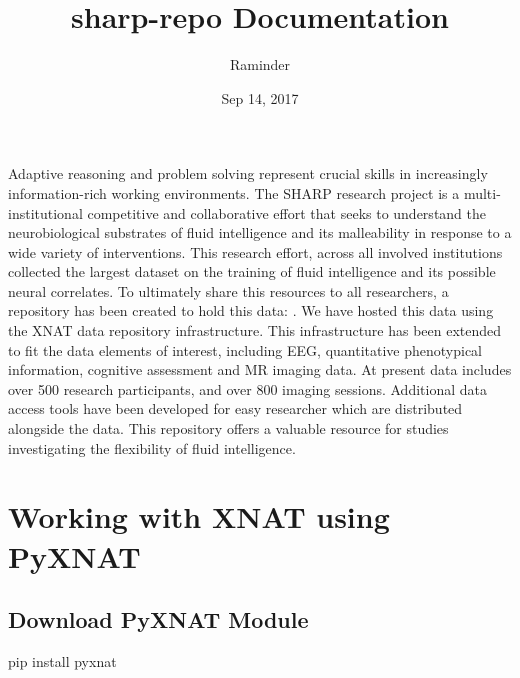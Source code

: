 \documentclass[letterpaper,10pt,english]{sphinxmanual}
\title{sharp-repo Documentation}
\date{Sep 14, 2017}
\author{Raminder}
\begin{document}
\maketitle
\sphinxtableofcontents
{}\label{\detokenize{index::doc}}


Adaptive reasoning and problem solving represent crucial skills in increasingly information-rich working environments. The SHARP research project is a multi-institutional competitive and collaborative effort that seeks to understand the neurobiological substrates of fluid intelligence and its malleability in response to a wide variety of interventions.  This research effort, across all involved institutions collected the largest dataset on the training of fluid intelligence and its possible neural correlates.  To ultimately share this resources to all researchers, a repository has been created to hold this data: .  We have hosted this data using the XNAT data repository infrastructure.  This infrastructure has been extended to fit the data elements of interest, including EEG, quantitative phenotypical information, cognitive assessment and MR imaging data.  At present data includes over 500 research participants, and over 800 imaging sessions. Additional data access tools have been developed for easy researcher which are distributed alongside the data. This repository offers a valuable resource for studies investigating the flexibility of fluid intelligence.

\noindent{}


\chapter{Working with XNAT using PyXNAT}
\label{\detokenize{Sharp_Working_Guide:working-with-xnat-using-pyxnat}}\label{\detokenize{Sharp_Working_Guide:welcome-to-strengthening-human-adaptive-reasoning-and-problem-solving-sharp-repository-documentation}}\label{\detokenize{Sharp_Working_Guide::doc}}

\section{Download PyXNAT Module}
\label{\detokenize{Sharp_Working_Guide:download-pyxnat-module}}
\begin{sphinxVerbatim}[commandchars=\\\{\}]
pip install pyxnat
\end{sphinxVerbatim}
\end{document}
